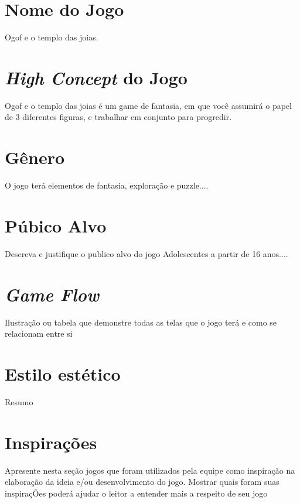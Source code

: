 \section{Nome do Jogo}
Ogof e o templo das joias.

\section{\textit{High Concept} do Jogo}
Ogof e o templo das joias é um game de fantasia, em que você assumirá o papel de 3 diferentes figuras, e trabalhar em conjunto para progredir.



\section{Gênero}

O jogo terá elementos de fantasia, exploração e puzzle....


\section{Púbico Alvo}

Descreva e justifique o publico alvo do jogo
Adolescentes a partir de 16 anos....

\section{\textit{Game Flow}}

Ilustração ou tabela que demonstre todas as telas que o jogo terá e como se relacionam entre si

\section{Estilo estético}

Resumo

\section{Inspirações}
Apresente nesta seção jogos que foram utilizados pela equipe como inspiração na elaboração da ideia e/ou desenvolvimento do jogo.
Mostrar quais foram suas inspiraçÕes poderá ajudar o leitor a entender mais a respeito de seu jogo

